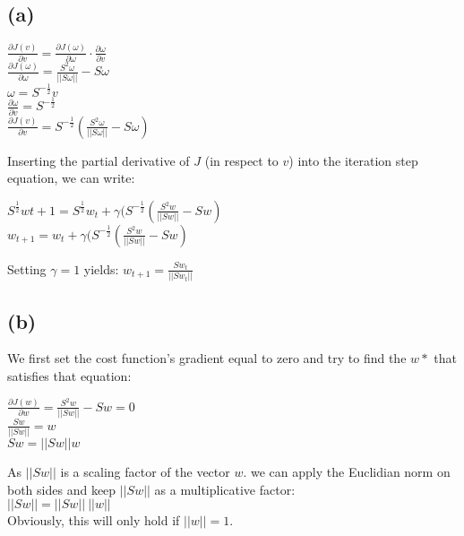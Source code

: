 \documentclass{article}
\begin{document}
\subsection*{(a)}
\begin{centering}
$\frac{\partial J(v)}{\partial v} = \frac{\partial J (\omega)}{\partial \omega} \cdot \frac{\partial \omega}{\partial v}$ \\
$\frac{\partial J (\omega)}{\partial \omega} = \frac{S^2 \omega}{||S \omega||} - S \omega $\\
$\omega = S^{-\frac{1}{2}} v$ \\
$\frac{\partial \omega}{\partial v} = S^{-\frac{1}{2}}$ \\
$\frac{\partial J (v)}{\partial v} = S^{-\frac{1}{2}} (\frac{S^2 \omega}{||S \omega||} - S \omega) $\\
\end{centering}



Inserting the partial derivative of $J$ (in respect to $v$) into the iteration step equation, we can write:

\begin{centering}
$S^{\frac{1}{2}} w{t+1} = S^{\frac{1}{2}} w_t + \gamma(S^{-\frac{1}{2}}(\frac{S^2 w}{||S w||} - S w)$ \\
$w_{t+1} = w_t + \gamma(S^{-\frac{1}{2}}(\frac{S^2 w}{||S w||} - S w)$

\end{centering}

Setting $\gamma=1$ yields: $w_{t+1} = \frac{Sw_t}{||Sw_t||}$

\subsection*{(b)}

We first set the cost function's gradient equal to zero and try to find the $w*$ that satisfies that equation: \\
\begin{centering}
 
$\frac{\partial J (w)}{\partial w} = \frac{S^2 w}{||Sw||} - Sw = 0$ \\
$\frac{Sw}{||Sw||} = w$ \\
$Sw = ||Sw|| w$
 
\end{centering}
 
As $||Sw||$ is a scaling factor of the vector $w$. we can apply the Euclidian norm on both sides and keep $||Sw||$ as a multiplicative factor: \\
$||Sw|| = ||Sw||\ ||w||$ \\
   
Obviously, this will only hold if $||w|| = 1$.

%

%

\end{document}

